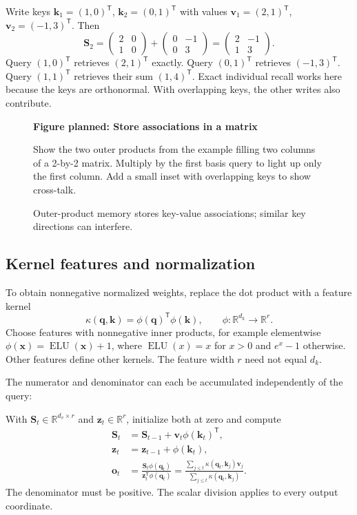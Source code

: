 \documentclass[11pt, oneside]{book}
\newcommand{\R}{\mathbb{R}}
\newcommand{\T}{^{\mathsf{T}}}           %
\let\originalsubsection\subsection
\renewcommand{\subsection}{\Needspace{6\baselineskip}\originalsubsection}
\newcommand{\figureplaceholder}[5]{%
\begin{figure}[htbp]
\centering
\begin{tcolorbox}[unbreakable,width=\linewidth,height=#1,colback=accent!3,
  colframe=accent!30,boxrule=0.5pt,arc=2.5mm,sharp corners=all,
  valign=center,halign=center,fontupper=\small]
{\bfseries\color{accent}Figure planned: #2}\par\medskip
{\color{gray!75!black}#3}
\end{tcolorbox}
\caption{#4}\label{#5}
\end{figure}}
\begin{document}
\begin{exbox}[title={A tiny associative memory}]
Write keys $\mathbf{k}_1=(1,0)\T$, $\mathbf{k}_2=(0,1)\T$ with values $\mathbf{v}_1=(2,1)\T$, $\mathbf{v}_2=(-1,3)\T$. Then
\[
 \mathbf{S}_2=
 \begin{pmatrix}2&0\\1&0\end{pmatrix}
 +\begin{pmatrix}0&-1\\0&3\end{pmatrix}
 =\begin{pmatrix}2&-1\\1&3\end{pmatrix}.
\]
Query $(1,0)\T$ retrieves $(2,1)\T$ exactly. Query $(0,1)\T$ retrieves $(-1,3)\T$. Query $(1,1)\T$ retrieves their sum $(1,4)\T$. Exact individual recall works here because the keys are orthonormal. With overlapping keys, the other writes also contribute.
\end{exbox}

\figureplaceholder{3.5cm}{Store associations in a matrix}{Show the two outer products from the example filling two columns of a 2-by-2 matrix. Multiply by the first basis query to light up only the first column. Add a small inset with overlapping keys to show cross-talk.}{Outer-product memory stores key-value associations; similar key directions can interfere.}{fig:outer-product-memory}

\subsection*{Kernel features and normalization}
To obtain nonnegative normalized weights, replace the dot product with a feature kernel
\[
 \kappa(\mathbf{q},\mathbf{k})=\phi(\mathbf{q})\T\phi(\mathbf{k}),\qquad
 \phi:\R^{d_k}\longrightarrow\R^r.
\]
Choose features with nonnegative inner products, for example elementwise $\phi(\mathbf{x})=\operatorname{ELU}(\mathbf{x})+1$, where $\operatorname{ELU}(x)=x$ for $x>0$ and $e^x-1$ otherwise. Other features define other kernels. The feature width $r$ need not equal $d_k$.

The numerator and denominator can each be accumulated independently of the query:
\begin{thmbox}[title={Normalized causal linear attention}]
With $\mathbf{S}_t\in\R^{d_v\times r}$ and $\mathbf{z}_t\in\R^r$, initialize both at zero and compute
\begin{align*}
 \mathbf{S}_t&=\mathbf{S}_{t-1}+\mathbf{v}_t\phi(\mathbf{k}_t)\T,\\
 \mathbf{z}_t&=\mathbf{z}_{t-1}+\phi(\mathbf{k}_t),\\
 \mathbf{o}_t&=\frac{\mathbf{S}_t\phi(\mathbf{q}_t)}
 {\mathbf{z}_t\T\phi(\mathbf{q}_t)}
 =\frac{\sum_{j\leq t}\kappa(\mathbf{q}_t,\mathbf{k}_j)\mathbf{v}_j}
 {\sum_{j\leq t}\kappa(\mathbf{q}_t,\mathbf{k}_j)}.
\end{align*}
The denominator must be positive. The scalar division applies to every output coordinate.
\end{thmbox}
\end{document}
